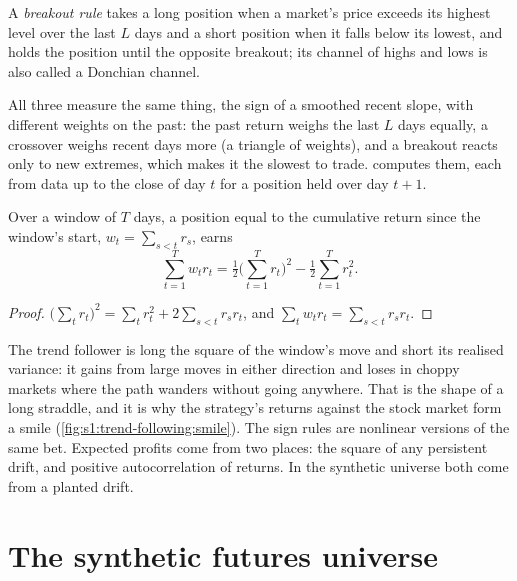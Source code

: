 \begin{definition}\label{def:s1:trend-following:breakout}
A \emph{breakout rule} takes a long position when a market's price exceeds its highest level over the last $L$ days and a short
position when it falls below its lowest, and holds the position until the opposite breakout; its channel of highs and lows is also called a Donchian
channel.
\end{definition}

All three measure the same thing, the sign of a smoothed recent slope, with different weights on the past: the past return weighs the last $L$ days
equally, a crossover weighs recent days more (a triangle of weights), and a breakout reacts only to new extremes, which makes it the slowest to trade.
 computes them, each from data up to the close of day $t$ for a position held over day $t + 1$.

\begin{proposition}\label{prop:s1:trend-following:convex}
Over a window of $T$ days, a position equal to the cumulative return since the window's start, $w_t = \sum_{s < t} r_s$, earns
\[
\sum_{t=1}^{T} w_t r_t = \tfrac12\Big(\sum_{t=1}^{T} r_t\Big)^2 - \tfrac12 \sum_{t=1}^{T} r_t^2 .
\]
\end{proposition}
\begin{proof}
$\big(\sum_t r_t\big)^2 = \sum_t r_t^2 + 2\sum_{s < t} r_s r_t$, and $\sum_t w_t r_t = \sum_{s < t} r_s r_t$.
\end{proof}

The trend follower is long the square of the window's move and short its realised variance: it gains from large moves in either direction and loses in
choppy markets where the path wanders without going anywhere. That is the shape of a long straddle, and it is why the strategy's returns against the
stock market form a smile (\cref{fig:s1:trend-following:smile}). The sign rules are nonlinear versions of the same bet. Expected profits come from two
places: the square of any persistent drift, and positive autocorrelation of returns. In the synthetic universe both come from a planted drift.

\section{The synthetic futures universe}

